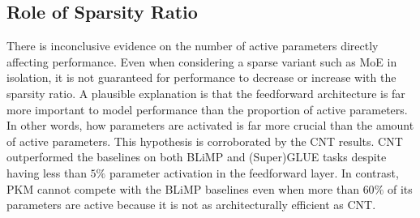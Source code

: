 \subsection{Role of Sparsity Ratio}
There is inconclusive evidence on the number of active parameters directly affecting performance. Even when considering a sparse variant such as MoE in isolation, it is not guaranteed for performance to decrease or increase with the sparsity ratio. A plausible explanation is that the feedforward architecture is far more important to model performance than the proportion of active parameters. In other words, how parameters are activated is far more crucial than the amount of active parameters. This hypothesis is corroborated by the CNT results. CNT outperformed the baselines on both BLiMP and (Super)GLUE tasks despite having less than $5\%$ parameter activation in the feedforward layer. In contrast, PKM cannot compete with the BLiMP baselines even when more than $60\%$ of its parameters are active because it is not as architecturally efficient as CNT.
 


